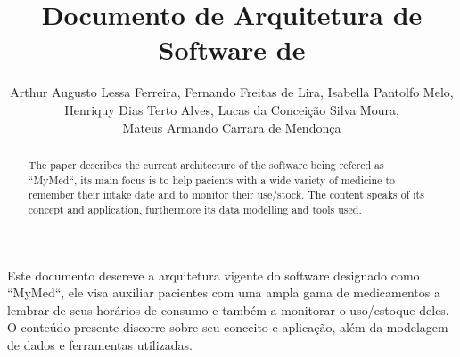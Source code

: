 \documentclass[
	article,			%
	12pt,				%
	oneside,			%
	a4paper,			%
    BIBLATEX,           %
	english,			%
	brazil,				%
	sumario=tradicional
	]{abntex2}
\title{Documento de Arquitetura de Software de \nomeprojeto}
\author{Arthur Augusto Lessa Ferreira\inst{1}, Fernando Freitas de Lira\inst{1}, Isabella Pantolfo Melo\inst{1},\\ Henriquy Dias Terto Alves\inst{1}, Lucas da Conceição Silva Moura\inst{1},\\ Mateus Armando Carrara de Mendonça\inst{1} }
\newcommand\nomeprojeto{MyMed}
\begin{document}


\frenchspacing 


%
%

\maketitle


\begin{abstract}
  The paper describes the current architecture of the software being refered as
  ``\nomeprojeto``, its main focus is to help pacients with a wide variety of
  medicine to remember their intake date and to monitor their use/stock.
  The content speaks of its concept and application, furthermore its
  data modelling and tools used.
\end{abstract}
     
\begin{resumo1} 
  Este documento descreve a arquitetura vigente do software designado como
  ``\nomeprojeto``, ele visa auxiliar pacientes com uma ampla gama de medicamentos
  a lembrar de seus horários de consumo e também a monitorar o uso/estoque deles.
  O conteúdo presente discorre sobre seu conceito e aplicação, além da
  modelagem de dados e ferramentas utilizadas.
\end{resumo1}






\textual
\end{document}
